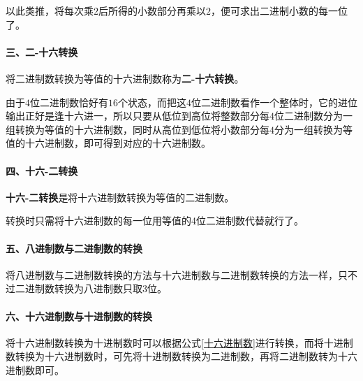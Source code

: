 以此类推，将每次乘$ 2 $后所得的小数部分再乘以$ 2 $，便可求出二进制小数的每一位了。

\paragraph{三、二-十六转换}
将二进制数转换为等值的十六进制数称为\textbf{二-十六转换}。

由于$ 4 $位二进制数恰好有$ 16 $个状态，而把这$ 4 $位二进制数看作一个整体时，它的进位输出正好是逢十六进一，所以只要从低位到高位将整数部分每$ 4 $位二进制数分为一组转换为等值的十六进制数，同时从高位到低位将小数部分每$ 4 $分为一组转换为等值的十六进制数，即可得到对应的十六进制数。

\paragraph{四、十六-二转换}
\textbf{十六-二转换}是将十六进制数转换为等值的二进制数。

转换时只需将十六进制数的每一位用等值的4位二进制数代替就行了。

\paragraph{五、八进制数与二进制数的转换}
将八进制数与二进制数转换的方法与十六进制数与二进制数转换的方法一样，只不过二进制数转换为八进制数只取$ 3 $位。

\paragraph{六、十六进制数与十进制数的转换}

将十六进制数转换为十进制数时可以根据公式\ref{十六进制数}进行转换，而将十进制数转换为十六进制数时，可先将十进制数转换为二进制数，再将二进制数转为十六进制数即可。